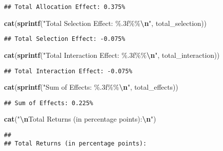 \documentclass[
]{article}
\newenvironment{Shaded}{\begin{snugshade}}{\end{snugshade}}
\newcommand{\FunctionTok}[1]{\textcolor[rgb]{0.13,0.29,0.53}{\textbf{#1}}}
\newcommand{\NormalTok}[1]{#1}
\newcommand{\SpecialCharTok}[1]{\textcolor[rgb]{0.81,0.36,0.00}{\textbf{#1}}}
\newcommand{\StringTok}[1]{\textcolor[rgb]{0.31,0.60,0.02}{#1}}
\begin{document}
\begin{verbatim}
## Total Allocation Effect: 0.375%
\end{verbatim}

\begin{Shaded}
\begin{Highlighting}[]
\FunctionTok{cat}\NormalTok{(}\FunctionTok{sprintf}\NormalTok{(}\StringTok{"Total Selection Effect: \%.3f\%\%}\SpecialCharTok{\textbackslash{}n}\StringTok{"}\NormalTok{, total\_selection))}
\end{Highlighting}
\end{Shaded}

\begin{verbatim}
## Total Selection Effect: -0.075%
\end{verbatim}

\begin{Shaded}
\begin{Highlighting}[]
\FunctionTok{cat}\NormalTok{(}\FunctionTok{sprintf}\NormalTok{(}\StringTok{"Total Interaction Effect: \%.3f\%\%}\SpecialCharTok{\textbackslash{}n}\StringTok{"}\NormalTok{, total\_interaction))}
\end{Highlighting}
\end{Shaded}

\begin{verbatim}
## Total Interaction Effect: -0.075%
\end{verbatim}

\begin{Shaded}
\begin{Highlighting}[]
\FunctionTok{cat}\NormalTok{(}\FunctionTok{sprintf}\NormalTok{(}\StringTok{"Sum of Effects: \%.3f\%\%}\SpecialCharTok{\textbackslash{}n}\StringTok{"}\NormalTok{, total\_effects))}
\end{Highlighting}
\end{Shaded}

\begin{verbatim}
## Sum of Effects: 0.225%
\end{verbatim}

\begin{Shaded}
\begin{Highlighting}[]
\FunctionTok{cat}\NormalTok{(}\StringTok{"}\SpecialCharTok{\textbackslash{}n}\StringTok{Total Returns (in percentage points):}\SpecialCharTok{\textbackslash{}n}\StringTok{"}\NormalTok{)}
\end{Highlighting}
\end{Shaded}

\begin{verbatim}
## 
## Total Returns (in percentage points):
\end{verbatim}
\end{document}
